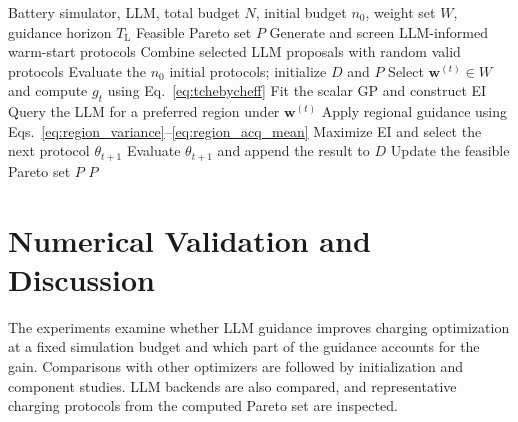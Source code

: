 \documentclass[journal]{IEEEtran}
\begin{document}
\begin{algorithm}[t]
\caption{LLMBO-MO}
\label{alg:llmbo}
\footnotesize
\begin{algorithmic}[1]
\Require Battery simulator, LLM, total budget $N$, initial budget $n_0$, weight set $W$, guidance horizon $T_{\mathrm L}$
\Ensure Feasible Pareto set $P$
\State Generate and screen LLM-informed warm-start protocols
\State Combine selected LLM proposals with random valid protocols
\State Evaluate the $n_0$ initial protocols; initialize $D$ and $P$
    \State Select $\mathbf w^{(t)}\in W$ and compute $g_t$ using Eq.~\eqref{eq:tchebycheff}
    \State Fit the scalar GP and construct EI
        \State Query the LLM for a preferred region under $\mathbf w^{(t)}$
            \State Apply regional guidance using Eqs.~\eqref{eq:region_variance}--\eqref{eq:region_acq_mean}
        \EndIf
    \EndIf
    \State Maximize EI and select the next protocol $\theta_{t+1}$
    \State Evaluate $\theta_{t+1}$ and append the result to $D$
    \State Update the feasible Pareto set $P$
\EndFor
\State \Return $P$
\end{algorithmic}
\end{algorithm}
\section{Numerical Validation and Discussion}
\label{sec:experiments}

The experiments examine whether LLM guidance improves charging optimization
at a fixed simulation budget and which part of the guidance accounts for the
gain. Comparisons with other optimizers are followed by initialization and
component studies. LLM backends are also compared, and representative
charging protocols from the computed Pareto set are inspected.
\end{document}
